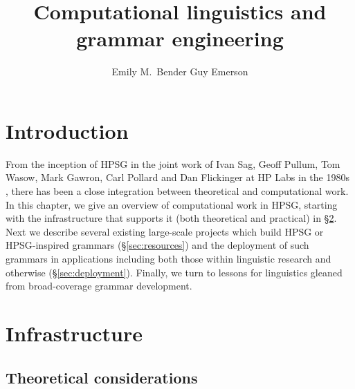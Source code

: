 \documentclass[output=paper]{langsci/langscibook}
\author{%
	Emily M.\ Bender\affiliation{University of Washington}%
	\lastand Guy Emerson\affiliation{University of Cambridge}
}
\title{Computational linguistics and grammar engineering}
\begin{document}


\section{Introduction}


From the inception of HPSG in the joint work of Ivan Sag, Geoff Pullum, Tom Wasow, Mark Gawron, Carl Pollard and Dan Flickinger at HP Labs in the 1980s \cite{FIXME-CLobit-or-other}, there has been a close integration between theoretical and computational work. In this chapter, we give an overview of computational work in HPSG, starting with the infrastructure that supports it (both theoretical and practical) in \S\ref{sec:infrastructure}. Next we describe several existing large-scale projects which build HPSG or HPSG-inspired grammars (\S\ref{sec:resources}) and the deployment of such grammars in applications including both those within linguistic research and otherwise (\S\ref{sec:deployment}).  Finally, we turn to lessons for linguistics gleaned from broad-coverage grammar development.



\section{Infrastructure}
\label{sec:infrastructure}


\subsection{Theoretical considerations}
\label{sec:theoretical}
\end{document}
